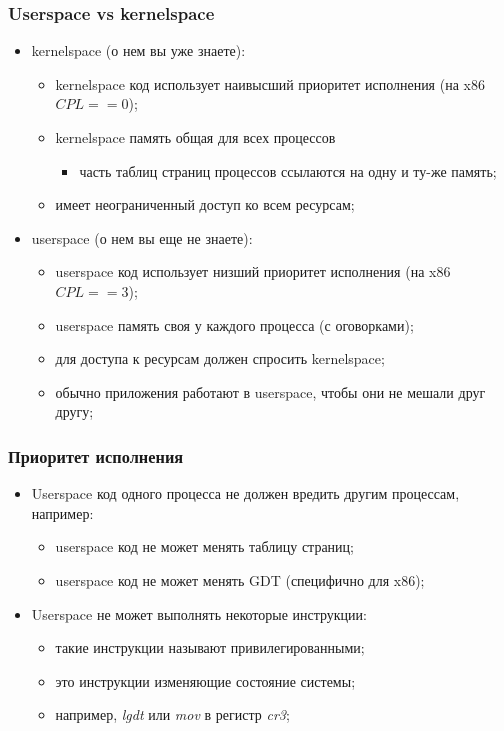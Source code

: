 \begin{frame}
\frametitle{Userspace vs kernelspace}
\begin{itemize}
  \item<1-> kernelspace (о нем вы уже знаете):
    \begin{itemize}
      \item kernelspace код использует наивысший приоритет исполнения (на x86 $CPL==0$);
      \item kernelspace память общая для всех процессов
        \begin{itemize}
          \item часть таблиц страниц процессов ссылаются на одну и ту-же память;
        \end{itemize}
      \item имеет неограниченный доступ ко всем ресурсам;
    \end{itemize}
  \item<2-> userspace (о нем вы еще не знаете):
    \begin{itemize}
      \item userspace код использует низший приоритет исполнения (на x86 $CPL==3$);
      \item userspace память своя у каждого процесса (с оговорками);
      \item для доступа к ресурсам должен спросить kernelspace;
      \item обычно приложения работают в userspace, чтобы они не мешали друг другу;
    \end{itemize}
\end{itemize}
\end{frame}

\begin{frame}
\frametitle{Приоритет исполнения}
\begin{itemize}
  \item<1-> Userspace код одного процесса не должен вредить другим процессам, например:
    \begin{itemize}
      \item userspace код не может менять таблицу страниц;
      \item userspace код не может менять GDT (специфично для x86);
    \end{itemize}
  \item<2-> Userspace не может выполнять некоторые инструкции:
    \begin{itemize}
      \item такие инструкции называют привилегированными;
      \item это инструкции изменяющие состояние системы;
      \item например, \emph{lgdt} или \emph{mov} в регистр \emph{cr3};
    \end{itemize}
\end{itemize}
\end{frame}

